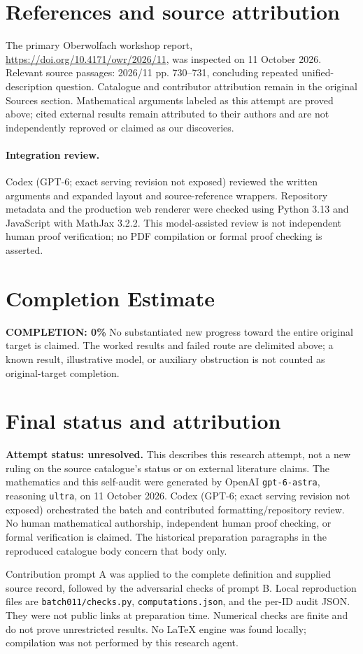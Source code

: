 \documentclass[11pt]{article}
\begin{document}
\section{References and source attribution}
The primary Oberwolfach workshop report, \url{https://doi.org/10.4171/owr/2026/11}, was inspected on 11 October 2026. Relevant source passages: 2026/11 pp. 730--731, concluding repeated unified-description question. Catalogue and contributor attribution remain in the original Sources section. Mathematical arguments labeled as this attempt are proved above; cited external results remain attributed to their authors and are not independently reproved or claimed as our discoveries.


\paragraph{Integration review.} Codex (GPT-6; exact serving revision not exposed) reviewed the written arguments and expanded layout and source-reference wrappers. Repository metadata and the production web renderer were checked using Python 3.13 and JavaScript with MathJax 3.2.2. This model-assisted review is not independent human proof verification; no PDF compilation or formal proof checking is asserted.

\section{Completion Estimate}
\noindent\textbf{COMPLETION: 0\%}
No substantiated new progress toward the entire original target is claimed. The worked results and failed route are delimited above; a known result, illustrative model, or auxiliary obstruction is not counted as original-target completion.

\section{Final status and attribution}
\textbf{Attempt status: unresolved.} This describes this research attempt, not a new ruling on the source catalogue's status or on external literature claims.
The mathematics and this self-audit were generated by OpenAI \texttt{gpt-6-astra}, reasoning \texttt{ultra}, on 11 October 2026. Codex (GPT-6; exact serving revision not exposed) orchestrated the batch and contributed formatting/repository review. No human mathematical authorship, independent human proof checking, or formal verification is claimed. The historical preparation paragraphs in the reproduced catalogue body concern that body only.

Contribution prompt A was applied to the complete definition and supplied source record, followed by the adversarial checks of prompt B. Local reproduction files are \texttt{batch011/checks.py}, \texttt{computations.json}, and the per-ID audit JSON. They were not public links at preparation time. Numerical checks are finite and do not prove unrestricted results. No LaTeX engine was found locally; compilation was not performed by this research agent.
\end{document}
